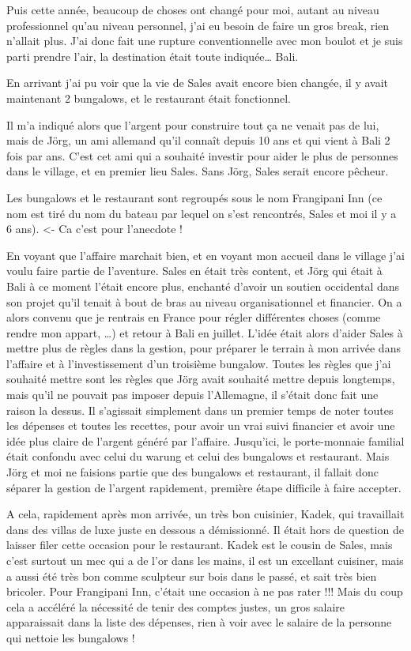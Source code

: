 Puis cette année, beaucoup de choses ont changé pour moi, autant au niveau professionnel qu’au niveau personnel, j’ai eu besoin de faire un gros break, rien n’allait plus. J’ai donc fait une rupture conventionnelle avec mon boulot et je suis parti prendre l’air, la destination était toute indiquée… Bali.

En arrivant j’ai pu voir que la vie de Sales avait encore bien changée, il y avait maintenant 2 bungalows, et le restaurant était fonctionnel.

Il m’a indiqué alors que l’argent pour construire tout ça ne venait pas de lui, mais de Jörg, un ami allemand qu’il connaît depuis 10 ans et qui vient à Bali 2 fois par ans. C’est cet ami qui a souhaité investir pour aider le plus de personnes dans le village, et en premier lieu Sales. Sans Jörg, Sales serait encore pêcheur.

Les bungalows et le restaurant sont regroupés sous le nom Frangipani Inn (ce nom est tiré du nom du bateau par lequel on s’est rencontrés, Sales et moi il y a 6 ans). <- Ca c’est pour l’anecdote !

En voyant que l’affaire marchait bien, et en voyant mon accueil dans le village j’ai voulu faire partie de l’aventure. Sales en était très content, et Jörg qui était à Bali à ce moment l’était encore plus, enchanté d’avoir un soutien occidental dans son projet qu’il tenait à bout de bras au niveau organisationnel et financier. On a alors convenu que je rentrais en France pour régler différentes choses (comme rendre mon appart, …) et retour à Bali en juillet. L’idée était alors d’aider Sales à mettre plus de règles dans la gestion, pour préparer le terrain à mon arrivée dans l’affaire et à l’investissement d’un troisième bungalow. Toutes les règles que j’ai souhaité mettre sont les règles que Jörg avait souhaité mettre depuis longtemps, mais qu’il ne pouvait pas imposer depuis l’Allemagne, il s’était donc fait une raison la dessus. Il s’agissait simplement dans un premier temps de noter toutes les dépenses et toutes les recettes, pour avoir un vrai suivi financier et avoir une idée plus claire de l’argent généré par l’affaire. Jusqu’ici, le porte-monnaie familial était confondu avec celui du warung et celui des bungalows et restaurant. Mais Jörg et moi ne faisions partie que des bungalows et restaurant, il fallait donc séparer la gestion de l’argent rapidement, première étape difficile à faire accepter.

A cela, rapidement après mon arrivée, un très bon cuisinier, Kadek, qui travaillait dans des villas de luxe juste en dessous a démissionné. Il était hors de question de laisser filer cette occasion pour le restaurant. Kadek est le cousin de Sales, mais c’est surtout un mec qui a de l’or dans les mains, il est un excellant cuisiner, mais a aussi été très bon comme sculpteur sur bois dans le passé, et sait très bien bricoler. Pour Frangipani Inn, c’était une occasion à ne pas rater !!! Mais du coup cela a accéléré la nécessité de tenir des comptes justes, un gros salaire apparaissait dans la liste des dépenses, rien à voir avec le salaire de la personne qui nettoie les bungalows !

